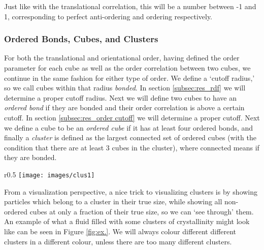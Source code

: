 \documentclass[thesis]{subfiles}
\begin{document}
Just like with the translational correlation, this will be a number between -1 and 1, corresponding to perfect anti-ordering and ordering respectively.

\subsubsection{Ordered Bonds, Cubes, and Clusters}

For both the translational and orientational order, having defined the order parameter for each cube as well as the order correlation between two cubes, we continue in the same fashion for either type of order. We define a `cutoff radius,' so we call cubes within that radius \emph{bonded}. In section \ref{subsec:res_rdf} we will determine a proper cutoff radius. Next we will define two cubes to have an \emph{ordered bond} if they are bonded and their order correlation is above a certain cutoff. In section \ref{subsec:res_order cutoff} we will determine a proper cutoff.
Next we define a cube to be an \emph{ordered cube} if it has at least four ordered bonds, and finally a \emph{cluster} is defined as the largest connected set of ordered cubes (with the condition that there are at least 3 cubes in the cluster), where connected means if they are bonded.
\\
\begin{wrapfigure}{r}{0.5\textwidth}
	\vspace{-20pt}
	\centering
	\texttt{[image: images/clus1]}
	\vspace{-20pt}
	\caption{A typical snapshot of a liquid of cubes, with different clusters colored differently, and all non-crystalline cubes drawn small.} \label{fig:ex.}
	\vspace{-15pt}
\end{wrapfigure}
\vspace{-10pt}

From a visualization perspective, a nice trick to visualizing clusters is by showing particles which belong to a cluster in their true size, while showing all non-ordered cubes at only a fraction of their true size, so we can `see through' them. An example of what a fluid filled with some clusters of crystallinity might look like can be seen in Figure \ref{fig:ex.}. We will always colour different  different clusters in a different colour, unless there are too many different clusters.
\end{document}
